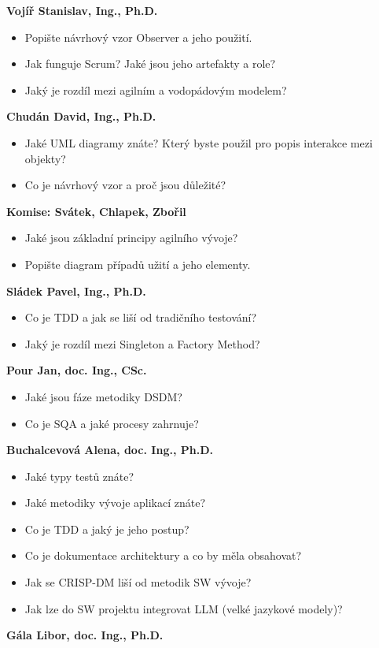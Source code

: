 \begin{profesorbox}
\textbf{Vojíř Stanislav, Ing., Ph.D.}
\begin{itemize}
  \item Popište návrhový vzor Observer a jeho použití.
  \item Jak funguje Scrum? Jaké jsou jeho artefakty a role?
  \item Jaký je rozdíl mezi agilním a vodopádovým modelem?
\end{itemize}
\textbf{Chudán David, Ing., Ph.D.}
\begin{itemize}
  \item Jaké UML diagramy znáte? Který byste použil pro popis interakce mezi objekty?
  \item Co je návrhový vzor a proč jsou důležité?
\end{itemize}
\textbf{Komise: Svátek, Chlapek, Zbořil}
\begin{itemize}
  \item Jaké jsou základní principy agilního vývoje?
  \item Popište diagram případů užití a jeho elementy.
\end{itemize}
\textbf{Sládek Pavel, Ing., Ph.D.}
\begin{itemize}
  \item Co je TDD a jak se liší od tradičního testování?
  \item Jaký je rozdíl mezi Singleton a Factory Method?
\end{itemize}
\textbf{Pour Jan, doc. Ing., CSc.}
\begin{itemize}
  \item Jaké jsou fáze metodiky DSDM?
  \item Co je SQA a jaké procesy zahrnuje?
\end{itemize}
\textbf{Buchalcevová Alena, doc. Ing., Ph.D.}
\begin{itemize}
  \item Jaké typy testů znáte?
  \item Jaké metodiky vývoje aplikací znáte?
  \item Co je TDD a jaký je jeho postup?
  \item Co je dokumentace architektury a co by měla obsahovat?
  \item Jak se CRISP-DM liší od metodik SW vývoje?
  \item Jak lze do SW projektu integrovat LLM (velké jazykové modely)?
\end{itemize}
\textbf{Gála Libor, doc. Ing., Ph.D.}

\end{profesorbox}
